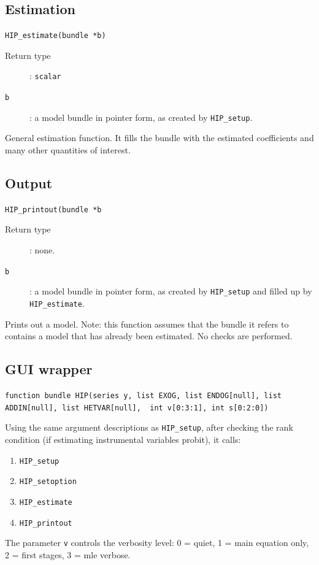 \documentclass[a4paper,10pt]{article}
\newenvironment{funcdoc}[1]
{\noindent\hrulefill\newline\texttt{#1}\par\noindent\hrulefill\par\medskip\par}
{\bigskip}
\newcommand{\cmd}[1]{\texttt{#1}}
\newcounter{script}[section]
\begin{document}
\subsection{Estimation}
\label{sec:syntax_estim}

\begin{funcdoc}{HIP\_estimate(bundle *b)}
\begin{description}
  \item[Return type]: \texttt{scalar}
  \item[\texttt{b}]: a model bundle in pointer form, as created by
    \cmd{HIP\_setup}.
  \end{description}

  General estimation function. It fills the bundle with the estimated
  coefficients and many other quantities of interest.
\end{funcdoc}

\subsection{Output}
\label{sec:syntax_output}

\begin{funcdoc}{HIP\_printout(bundle *b}
\begin{description}
  \item[Return type]: none.
  \item[\texttt{b}]: a model bundle in pointer form, as created by
    \cmd{HIP\_setup} and filled up by \cmd{HIP\_estimate}.
  \end{description}
  Prints out a model. Note: this function assumes that the bundle it
  refers to contains a model that has already been estimated. No
  checks are performed.
\end{funcdoc}

\subsection{GUI wrapper}
\label{sec:syntax_GUI}

\begin{funcdoc}{function bundle HIP(series y, list EXOG, list ENDOG[null],\ 
		    list ADDIN[null], list HETVAR[null], \
		    int v[0:3:1], int s[0:2:0])}
Using the same argument descriptions as \texttt{HIP\_setup}, after
checking the rank condition (if estimating instrumental variables
probit), it calls:
  \begin{enumerate}
  \item \texttt{HIP\_setup}
  \item \texttt{HIP\_setoption}
  \item \texttt{HIP\_estimate}
  \item \texttt{HIP\_printout}
\end{enumerate}
The parameter \cmd{v} controls the verbosity level: 0 = quiet, 1 =
main equation only, 2 = first stages, 3 = mle verbose.

\end{funcdoc}
\end{document}

